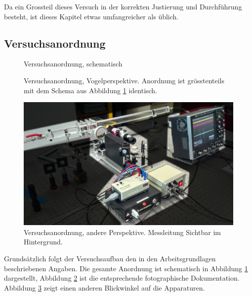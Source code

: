 Da ein Grossteil dieses Versuch in der korrekten Justierung und Durchf\"uhrung
besteht, ist dieses Kapitel etwas umfangreicher als \"ublich.

\subsection{Versuchsanordnung}
\label{subsec:versuchsanordnung}

\begin{figure}[h!t]
    \centering
    \resizebox{\textwidth}{!}{}
    \caption{%
        Versuchsanordnung, schematisch
    }
    \label{fig:versuchsanordnung:schema}
\end{figure}

\begin{figure}[h!t]
    \centering
    \resizebox{.85\textwidth}{!}{}
    \caption{%
        Versuchsanordnung, Vogelperspektive. Anordnung ist gr\"osstenteils mit
        dem Schema aus Abbildung \ref{fig:versuchsanordnung:schema} identisch.
    }
    \label{fig:versuchsanordnung:birdseye}
\end{figure}

\begin{figure}[h!t]
    \centering
    \includegraphics[width=.85\textwidth]{images/versuchsanordnung2.jpeg}
    \caption{%
        Versuchsanordnung,   andere   Perspektive. Messleitung   Sichtbar   im
        Hintergrund.
    }
    \label{fig:versuchsanordnung:perspective}
\end{figure}

Grunds\"atzlich  folgt   der  Versuchsaufbau  den  in   den  Arbeitsgrundlagen
beschriebenen    Angaben. Die   gesamte    Anordnung   ist    schematisch   in
Abbildung     \ref{fig:versuchsanordnung:schema}    dargestellt,     Abbildung
\ref{fig:versuchsanordnung:birdseye}  ist   die  entsprechende  fotographische
Dokumentation.  Abbildung  \ref{fig:versuchsanordnung:perspective} zeigt einen
anderen Blickwinkel auf die Apparaturen.

